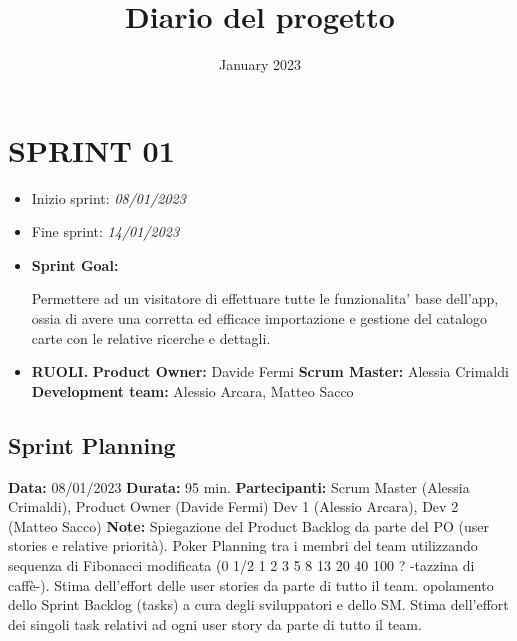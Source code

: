 \documentclass{article}
\title{Diario del progetto}
\date{January 2023}
\begin{document}
    \maketitle

    \section{SPRINT 01}

    \begin{itemize}
        \item Inizio sprint: \textit{08/01/2023}
        \item Fine sprint: \textit{14/01/2023}
    \end{itemize}

    \begin{itemize}
        \item \textbf{Sprint Goal:}
        \begin{indent}
            \newline Permettere ad un visitatore di effettuare tutte le funzionalita' base dell'app, ossia di avere una corretta ed efficace importazione e gestione del catalogo carte con le relative ricerche e dettagli.
        \end{indent}
    \end{itemize}

    \begin{itemize}
        \item \textbf{RUOLI.}
        \newline \textbf{Product Owner:} Davide Fermi
        \newline \textbf{Scrum Master:} Alessia Crimaldi
        \newline \textbf{Development team:} Alessio Arcara, Matteo Sacco
    \end{itemize}

    \subsection{Sprint Planning}
    \item \textbf{Data:} 08/01/2023
    \newline \textbf{Durata:} 95 min.
    \newline \textbf{Partecipanti:} Scrum Master (Alessia Crimaldi), Product Owner (Davide Fermi) Dev 1 (Alessio Arcara), Dev 2 (Matteo Sacco)
    \newline \textbf{Note:} Spiegazione del Product Backlog da parte del PO (user stories e relative priorità). Poker Planning tra i membri del team utilizzando sequenza di Fibonacci modificata (0  1/2  1  2  3  5  8  13  20  40  100  ?  -tazzina di caffè-). Stima dell'effort delle user stories da parte di tutto il team. opolamento dello Sprint Backlog (tasks) a cura degli sviluppatori e dello SM. Stima dell'effort dei singoli task relativi ad ogni user story da parte di tutto il team.
\end{document}
